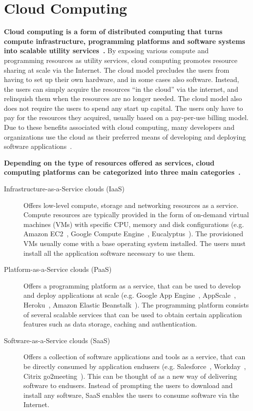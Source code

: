 \section{Cloud Computing}

\textbf{Cloud computing is a form of distributed computing that turns compute infrastructure, programming
platforms and software systems into scalable utility services~\cite{hassan2011demystifying,Mell:2011:SND:2206223}.}
By exposing various compute and programming
resources as utility services, cloud computing promotes resource sharing at scale via the Internet.
The cloud model precludes the users from having to set up their own hardware, and in some cases also software. Instead,
the users can simply acquire the resources ``in the cloud'' via the internet, and relinquish them when
the resources are no longer needed. The cloud model also does not require the users to spend any start up
capital. The users only have to pay for the resources they acquired, usually based on a pay-per-use
billing model. Due to these benefits associated with cloud computing,
many developers and organizations use the cloud as their preferred means of developing and deploying
software applications~\cite{Antonopoulos:2010:CCP:1855007,Pinheiro:2014:ACC:2618168.2618188,cloud-growth}. 

\textbf{Depending on the type of resources
offered as services, cloud computing platforms can be categorized into three main categories~\cite{Mell:2011:SND:2206223}.}
\begin{description}
\item [Infrastructure-as-a-Service clouds (IaaS)]
Offers low-level compute, storage and networking
resources as a service. Compute resources are typically provided in the form of on-demand virtual machines (VMs)
with specific CPU, memory and disk configurations 
(e.g. Amazon EC2~\cite{amazon-ec2-web}, Google Compute Engine~\cite{gce-web}, Eucalyptus~\cite{eucalyptus-tr}). 
The provisioned VMs usually come with a base operating system installed. The users must install all the application software
necessary to use them.
\item [Platform-as-a-Service clouds (PaaS)]
Offers a programming platform as a service, that can be used to develop and deploy applications at scale 
(e.g. Google App Engine~\cite{gae}, AppScale~\cite{6488671}, Heroku~\cite{heroku-web}, Amazon Elastic Beanstalk~\cite{amazon-ebs-web}). 
The programming platform consists
of several scalable services that can be used to obtain certain application features such as data storage, caching
and authentication.
\item [Software-as-a-Service clouds (SaaS)]
Offers a collection of software applications and tools as a service, that can be directly consumed by
application endusers (e.g. Salesforce~\cite{sf-saas}, Workday~\cite{workday}, Citrix go2meeting~\cite{gotomeeting}). 
This can be thought of as a new way of delivering software to
endusers. Instead of prompting the users to download and install any software, SaaS enables the users
to consume software via the Internet.  
\end{description}

